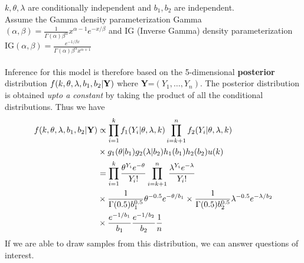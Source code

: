 \documentclass[11pt]{article}
\begin{document}
$k,\theta,\lambda$ are conditionally independent and $b_1,b_2$ are independent. \\ Assume the Gamma density parameterization Gamma$(\alpha,\beta) = \frac{1}{\Gamma(\alpha)\beta^{\alpha}} x^{\alpha-1} e^{-x/\beta}$ and IG (Inverse Gamma) density parameterization IG$(\alpha,\beta) = \frac{e^{-1/\beta x}} {\Gamma(\alpha) \beta^{\alpha} x^{\alpha + 1}}$\\\\
Inference for this model is therefore based on the 5-dimensional
{\bf posterior} distribution $f(k,\theta,\lambda,b_1,b_2| {\bf Y})$ where
{\bf Y}=$(Y_1,\dots,Y_n)$. The posterior distribution is obtained {\it upto a constant} by
taking the product of all the conditional distributions. Thus we have
\begin{equation*}
\begin{split}
f(k,\theta,\lambda,b_1,b_2| {\bf Y}) & \propto \prod_{i=1}^k f_1(Y_i|\theta,\lambda,k) \prod_{i=k+1}^n f_2(Y_i|\theta,\lambda,k)\\
& \times g_1(\theta|b_1) g_2(\lambda|b_2) h_1(b_1) h_2(b_2) u(k)\\
& = \prod_{i=1}^k \frac{\theta^{Y_i} e^{-\theta}}{Y_i !} \prod_{i=k+1}^n \frac{\lambda^{Y_i} e^{-\lambda}}{Y_i !} \\
& \times  \frac{1}{\Gamma(0.5)b_1^{0.5}} \theta^{-0.5} e^{-\theta/b_1} \times \frac{1}{\Gamma(0.5)b_2^{0.5}} \lambda^{-0.5} e^{-\lambda/b_2}\\ 
& \times \frac{e^{-1/b_1}}{b_1} \frac{e^{-1/b_2}}{b_2}  \frac{1}{n}
\end{split}
\end{equation*}
If we are able to draw samples from this distribution, we can answer
questions of interest. %
\end{document}

